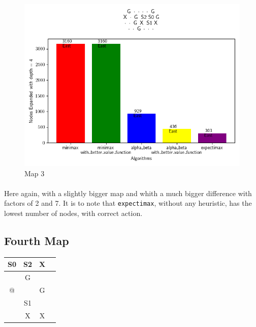\documentclass{article}
\begin{document}
\begin{figure}[h]
    \centering
    \includegraphics[width=\textwidth]{media/map2023_10_29_13_53_25.png}
    \caption{Map 3}
    \label{fig:image3}
\end{figure}
\vspace{1em}

\paragraph{}
Here again, with a slightly bigger map and whith a much bigger difference with factors of 2 and 7.
It is to note that \texttt{expectimax}, without any heuristic, has the lowest number of nodes, with correct action.


\newpage
\subsection{Fourth Map}

\begin{table}[h]
    \centering
    \begin{tabular}{|c|c|c|c|}
    \hline
    S0 & S2 & X \\
    \hline
     & G & \\
    \hline
    @ & & G \\
    \hline
     & S1 & \\
    \hline
     & X & X \\
    \hline
    \end{tabular}
    \label{tab:another_example_grid}
\end{table}
\end{document}
